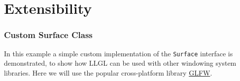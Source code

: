 \documentclass{article}
\begin{document}

\newpage
\part{Extensibility}

\section{Custom Surface Class}
\label{sec:custom_surface}

In this example a simple custom implementation of the \texttt{Surface} interface is demonstrated,
to show how LLGL can be used with other windowing system libraries.
Here we will use the popular cross-platform library \href{http://www.glfw.org/}{GLFW}.
\end{document}
